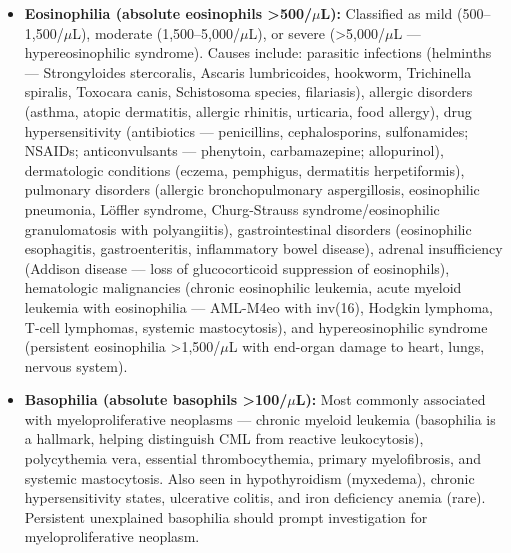 \begin{itemize}
  \item \textbf{Eosinophilia (absolute eosinophils >500/$\mu$L):} Classified as mild (500--1,500/$\mu$L), moderate (1,500--5,000/$\mu$L), or severe (>5,000/$\mu$L --- hypereosinophilic syndrome). Causes include: parasitic infections (helminths --- Strongyloides stercoralis, Ascaris lumbricoides, hookworm, Trichinella spiralis, Toxocara canis, Schistosoma species, filariasis), allergic disorders (asthma, atopic dermatitis, allergic rhinitis, urticaria, food allergy), drug hypersensitivity (antibiotics --- penicillins, cephalosporins, sulfonamides; NSAIDs; anticonvulsants --- phenytoin, carbamazepine; allopurinol), dermatologic conditions (eczema, pemphigus, dermatitis herpetiformis), pulmonary disorders (allergic bronchopulmonary aspergillosis, eosinophilic pneumonia, L\"{o}ffler syndrome, Churg-Strauss syndrome/eosinophilic granulomatosis with polyangiitis), gastrointestinal disorders (eosinophilic esophagitis, gastroenteritis, inflammatory bowel disease), adrenal insufficiency (Addison disease --- loss of glucocorticoid suppression of eosinophils), hematologic malignancies (chronic eosinophilic leukemia, acute myeloid leukemia with eosinophilia --- AML-M4eo with inv(16), Hodgkin lymphoma, T-cell lymphomas, systemic mastocytosis), and hypereosinophilic syndrome (persistent eosinophilia >1,500/$\mu$L with end-organ damage to heart, lungs, nervous system).
  \item \textbf{Basophilia (absolute basophils >100/$\mu$L):} Most commonly associated with myeloproliferative neoplasms --- chronic myeloid leukemia (basophilia is a hallmark, helping distinguish CML from reactive leukocytosis), polycythemia vera, essential thrombocythemia, primary myelofibrosis, and systemic mastocytosis. Also seen in hypothyroidism (myxedema), chronic hypersensitivity states, ulcerative colitis, and iron deficiency anemia (rare). Persistent unexplained basophilia should prompt investigation for myeloproliferative neoplasm.
\end{itemize}

